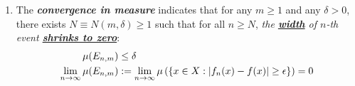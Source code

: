 \documentclass[11pt]{article}
\begin{document}
\begin{itemize}
\begin{remark}
\begin{enumerate}
\item The \emph{\textbf{convergence in measure}} indicates that for any $m\ge 1$ and any $\delta > 0$, there exists $N \equiv N(m, \delta)\ge 1$ such that for all $n \ge N$, \emph{the \underline{\textbf{width}} of $n$-th event \underline{\textbf{shrinks to zero}}}:
\begin{align*}
\mu(E_{n,m}) &\le \delta \\
 \lim\limits_{n\rightarrow \infty}\mu(E_{n, m}) &:=  \lim\limits_{n\rightarrow \infty}\mu\left(\left\{x \in X: \left\lvert f_n(x) - f(x) \right\rvert \ge \epsilon\right\} \right) =0 
\end{align*} 
\end{enumerate}
\end{remark}
%
%
%
%
%
\end{itemize}
\end{document}
